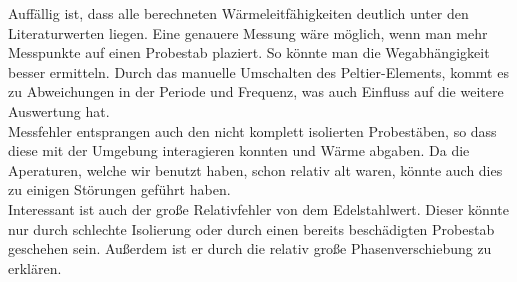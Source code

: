 Auffällig ist, dass alle berechneten Wärmeleitfähigkeiten deutlich unter den Literaturwerten liegen.
Eine genauere Messung wäre möglich, wenn man mehr Messpunkte auf einen Probestab plaziert. So könnte man die Wegabhängigkeit besser ermitteln.
Durch das manuelle Umschalten des Peltier-Elements, kommt es zu Abweichungen in der Periode und Frequenz, was auch Einfluss auf die weitere Auswertung hat.
\\
Messfehler entsprangen auch den nicht komplett isolierten Probestäben, so dass diese mit der Umgebung interagieren konnten und Wärme abgaben.
Da die Aperaturen, welche wir benutzt haben, schon relativ alt waren, könnte auch dies zu einigen Störungen geführt haben.
\\
Interessant ist auch der große Relativfehler von dem Edelstahlwert. Dieser könnte nur durch schlechte Isolierung oder durch einen bereits beschädigten Probestab geschehen sein.
Außerdem ist er durch die relativ große Phasenverschiebung zu erklären. 

